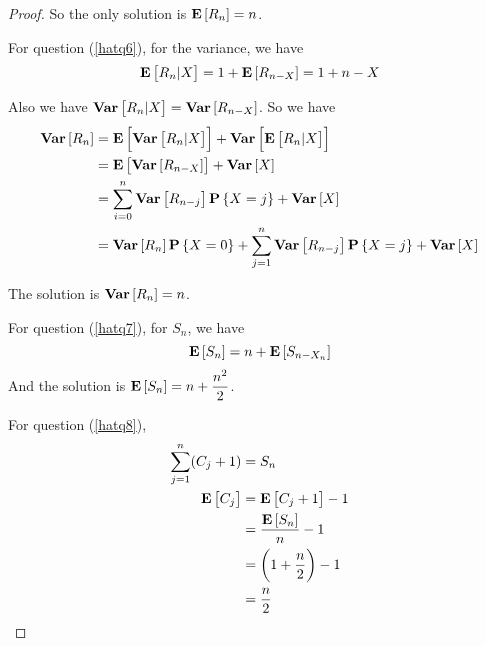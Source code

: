 \begin{proof}
    So the only solution is $\expect{R_n} = n$.
    
    For question (\ref{hatq6}), for the variance, we have
    \begin{equation*}
        \expect{R_n|X} = 1 + \expect{R_{n-X}} = 1 + n - X
    \end{equation*}
    
    Also we have $\variance{R_n|X} = \variance{R_{n-X}}$. So we have
    \begin{equation*}
        \begin{aligned}
            \variance{R_n} &= \expect{\variance{R_n|X}} + \variance{\expect{R_n|X}} \\
            &= \expect{\variance{R_{n-X}}} + \variance{X} \\
            &= \sum_{i=0}^n \variance{R_{n-j}} \probability{X=j} + \variance{X} \\
            &= \variance{R_n}\probability{X = 0} + \sum_{j=1}^n \variance{R_{n-j}} \probability{X=j} + \variance{X}
        \end{aligned}
    \end{equation*}
    
    The solution is $\variance{R_n} = n$.
    
    
    For question (\ref{hatq7}), for $S_n$, we have
    \begin{equation*}
        \expect{S_n} = n + \expect{S_{n - X_n}}
    \end{equation*}
    And the solution is $\expect{S_n} = n + \dfrac{n^2}{2}$.
    
    For question (\ref{hatq8}),
    \begin{equation*}
        \begin{aligned}
            \sum_{j=1}^n (C_j + 1) & = S_n \\
            \expect{C_j} &= \expect{C_j + 1} -1 \\
            &= \dfrac{\expect{S_n}}{n}  -1\\
            &= \left( 1 + \frac{n}{2} \right) - 1 \\
            &= \frac{n}{2}
        \end{aligned}
    \end{equation*}
\end{proof}

